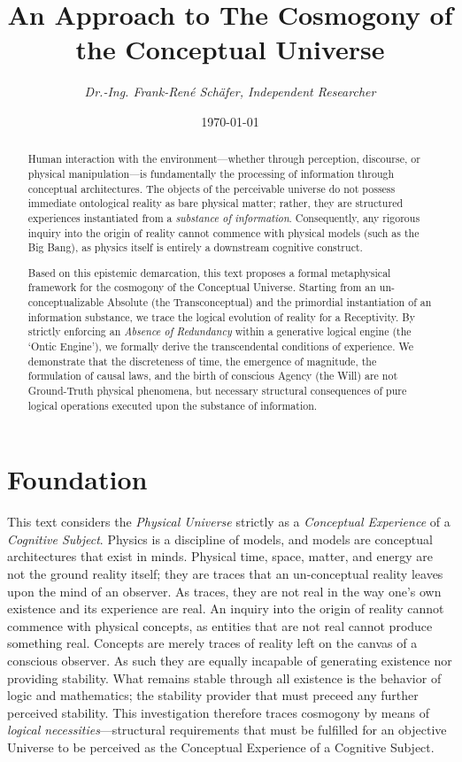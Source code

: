 \documentclass[11pt, a4paper]{article}
\title{\textbf{An Approach to The Cosmogony of the Conceptual Universe}}
\author{\textit{Dr.-Ing. Frank-René Schäfer, Independent Researcher}}
\date{\today}
\theoremstyle{formalism}
\begin{document}
\maketitle

\begin{abstract}

Human interaction with the environment---whether through perception, discourse,
or physical manipulation---is fundamentally the processing of information through
conceptual architectures. The objects of the perceivable universe do not possess
immediate ontological reality as bare physical matter; rather, they are structured
experiences instantiated from a \textit{substance of information}. Consequently,
any rigorous inquiry into the origin of reality cannot commence with physical
models (such as the Big Bang), as physics itself is entirely a downstream
cognitive construct. 

Based on this epistemic demarcation, this text proposes a formal metaphysical
framework for the cosmogony of the Conceptual Universe. Starting from an
un-conceptualizable Absolute (the Transconceptual) and the primordial instantiation of
an information substance, we trace the logical evolution of reality for a Receptivity.
By strictly enforcing an \textit{Absence of Redundancy} within a
generative logical engine (the `Ontic Engine'), we formally derive the transcendental
conditions of experience. We demonstrate that the discreteness of time, the
emergence of magnitude, the formulation of causal laws, and the birth of conscious
Agency (the Will) are not Ground-Truth physical phenomena, but necessary structural
consequences of pure logical operations executed upon the substance of information.

\end{abstract}

\section{Foundation}

This text considers the \textit{Physical Universe} strictly as a
\textit{Conceptual Experience} of a \textit{Cognitive Subject}. Physics is a
discipline of models, and models are conceptual architectures that exist in
minds. Physical time, space, matter, and energy are not the ground reality
itself; they are traces that an un-conceptual reality leaves upon the mind of
an observer. As traces, they are not real in the way one's own existence and
its experience are real. An inquiry into the origin of reality cannot commence
with physical concepts, as entities that are not real cannot produce something
real. Concepts are merely traces of reality left on the canvas of a conscious
observer. As such they are equally incapable of generating existence nor
providing stability. What remains stable through all existence is the behavior
of logic and mathematics; the stability provider that must preceed any further
perceived stability. This investigation therefore traces cosmogony by means of
\textit{logical necessities}---structural requirements that must be fulfilled
for an objective Universe to be perceived as the Conceptual Experience of a
Cognitive Subject. 
\end{document}
